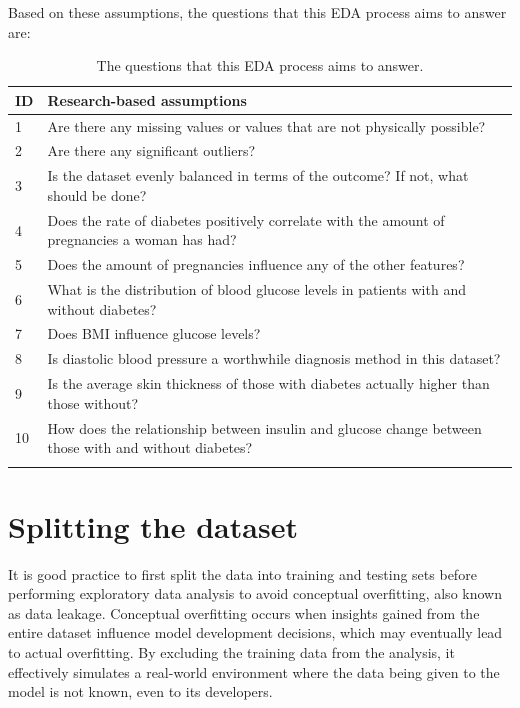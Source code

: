 \documentclass[12pt]{report}
\newcommand{\para}{\vspace{8pt}\noindent}
\begin{document}
\para Based on these assumptions, the questions that this EDA process aims to answer are:


\begin{longtable}{ | p{} | p{} | }
    \hline
    \cellcolor{blue!25} ID & \cellcolor{blue!25} Research-based assumptions \\
    \hline
    1 & Are there any missing values or values that are not physically possible?\\
    \hline
    2 & Are there any significant outliers?\\
    \hline 
    3 & Is the dataset evenly balanced in terms of the outcome? If not, what should be done?\\
    \hline 
    4 & Does the rate of diabetes positively correlate with the amount of pregnancies a woman has had?\\
    \hline
    5 & Does the amount of pregnancies influence any of the other features?\\
    \hline
    6 & What is the distribution of blood glucose levels in patients with and without diabetes?\\
    \hline
    7 & Does BMI influence glucose levels?\\
    \hline
    8 & Is diastolic blood pressure a worthwhile diagnosis method in this dataset?\\
    \hline
    9 & Is the average skin thickness of those with diabetes actually higher than those without?\\
    \hline
    10 & How does the relationship between insulin and glucose change between those with and without diabetes?\\
    \hline
    \caption{The questions that this EDA process aims to answer.}\label{tab:Questions}
\end{longtable}
\pagebreak

\section{Splitting the dataset}
It is good practice to first split the data into training and testing sets before performing exploratory data analysis
to avoid conceptual overfitting, also known as data leakage. Conceptual overfitting occurs when insights gained from the entire dataset 
influence model development decisions, which may eventually lead to actual overfitting. By excluding the training data from the analysis,
it effectively simulates a real-world environment where the data being given to the model is not known, even to its developers.
\end{document}
